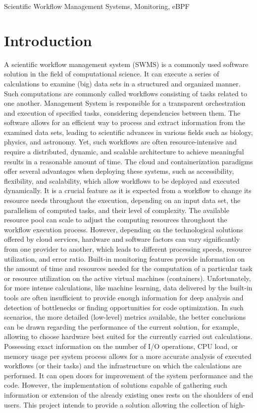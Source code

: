 \documentclass[lettersize,journal]{IEEEtran}
\begin{document}
\begin{IEEEkeywords}
	Scientific Workflow Management Systems, Monitoring, eBPF
\end{IEEEkeywords}

\section{Introduction}
A scientific workflow management system (SWMS) is a commonly used software solution in the field of computational science. It can execute a series of calculations to examine (big) data sets in a structured and organized manner. Such computations are commonly called workflows consisting of tasks related to one another. Management System is responsible for a transparent orchestration and execution of specified tasks, considering dependencies between them. The software allows for an efficient way to process and extract information from the examined data sets, leading to scientific advances in various fields such as biology, physics, and astronomy\cite{challengesSW}. Yet, such workflows are often resource-intensive and require a distributed, dynamic, and scalable architecture to achieve meaningful results in a reasonable amount of time. The cloud and containerization paradigms offer several advantages when deploying these systems, such as accessibility, flexibility, and scalability, which allow workflows to be deployed and executed dynamically. It is a crucial feature as it is expected from a workflow to change its resource needs throughout the execution, depending on an input data set, the parallelism of computed tasks, and their level of complexity. The available resource pool can scale to adjust the computing resources throughout the workflow execution process. However, depending on the technological solutions offered by cloud services, hardware and software factors can vary significantly from one provider to another, which leads to different processing speeds, resource utilization, and error ratio\cite{compareCloud}. Built-in monitoring features provide information on the amount of time and resources needed for the computation of a particular task or resource utilization on the active virtual machines (containers). Unfortunately, for more intense calculations, like machine learning, data delivered by the built-in tools are often insufficient to provide enough information for deep analysis and detection of bottlenecks or finding opportunities for code optimization. In such scenarios, the more detailed (low-level) metrics available, the better conclusions can be drawn regarding the performance of the current solution, for example, allowing to choose hardware best suited for the currently carried out calculations. Possessing exact information on the number of I/O operations, CPU load, or memory usage per system process allows for a more accurate analysis of executed workflows (or their tasks) and the infrastructure on which the calculations are performed. It can open doors for improvement of the system performance and the code. However, the implementation of solutions capable of gathering such information or extension of the already existing ones rests on the shoulders of end users. This project intends to provide a solution allowing the collection of high- 
\end{document}
